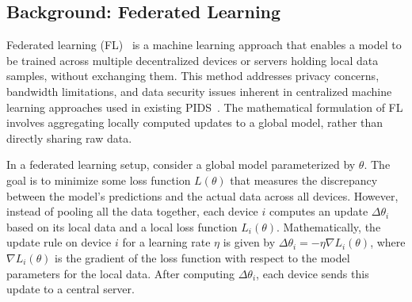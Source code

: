 
\subsection{Background: Federated Learning}

Federated learning (FL)~\cite{mcmahan2017communication} is a machine learning approach that enables a model to be trained across multiple decentralized devices or servers holding local data samples, without exchanging them. This method addresses privacy concerns, bandwidth limitations, and data security issues inherent in centralized machine learning approaches used in existing PIDS~\cite{flash2024,cheng2023kairos,wang2022threatrace}. The mathematical formulation of FL involves aggregating locally computed updates to a global model, rather than directly sharing raw data.

In a federated learning setup, consider a global model parameterized by \(\theta\). The goal is to minimize some loss function \(L(\theta)\) that measures the discrepancy between the model's predictions and the actual data across all devices. However, instead of pooling all the data together, each device \(i\) computes an update \(\Delta \theta_i\) based on its local data and a local loss function \(L_i(\theta)\). Mathematically, the update rule on device \(i\) for a learning rate \(\eta\) is given by \(\Delta \theta_i = -\eta \nabla L_i(\theta)\), where \(\nabla L_i(\theta)\) is the gradient of the loss function with respect to the model parameters for the local data. After computing \(\Delta \theta_i\), each device sends this update to a central server.

